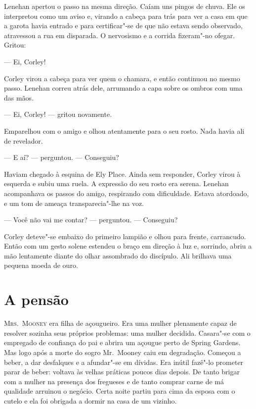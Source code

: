 Lenehan apertou o passo na mesma direção.  Caíam uns pingos de chuva.  Ele os
interpretou como um aviso e, virando a cabeça para trás para ver a casa em que
a garota havia entrado e para certificar"-se de que não estava sendo observado,
atravessou a rua em disparada.  O nervosismo e a corrida fizeram"-no ofegar.
Gritou:

--- Ei, Corley!

Corley virou a cabeça para ver quem o chamara, e então continuou no mesmo
passo.  Lenehan correu atrás dele, arrumando a capa sobre os ombros com uma das
mãos.

--- Ei, Corley! --- gritou novamente.

Emparelhou com o amigo e olhou atentamente para o seu rosto.  Nada havia ali de
revelador.

--- E aí? --- perguntou.  --- Conseguiu?

Haviam chegado à esquina de Ely Place.  Ainda sem responder, Corley virou à
esquerda e subiu uma ruela.  A expressão do seu rosto era serena.  Lenehan
acompanhava os passos do amigo, respirando com dificuldade.  Estava atordoado,
e um tom de ameaça transparecia"-lhe na voz.

--- Você não vai me contar? --- perguntou.  --- Conseguiu?

Corley deteve"-se embaixo do primeiro lampião e olhou para frente, carrancudo.
Então com um gesto solene estendeu o braço em direção à luz e, sorrindo, abriu
a mão lentamente diante do olhar assombrado do discípulo.  Ali brilhava uma
pequena moeda de ouro.


\chapter{A pensão}

\textsc{Mrs.~Mooney} era filha de açougueiro.  Era uma mulher plenamente capaz
de resolver sozinha seus próprios problemas: uma mulher decidida.  Casara"-se
com o empregado de confiança do pai e abrira um açougue perto de Spring
Gardens.  Mas logo após a morte do sogro Mr.~Mooney caiu em degradação.
Começou a beber, a dar desfalques e a afundar"-se em dívidas.  Era inútil
fazê"-lo prometer parar de beber: voltava às velhas práticas poucos dias depois.
De tanto brigar com a mulher na presença dos fregueses e de tanto comprar carne
de má qualidade arruinou o negócio.  Certa noite partiu para cima da esposa com
o cutelo e ela foi obrigada a dormir na casa de um vizinho.

